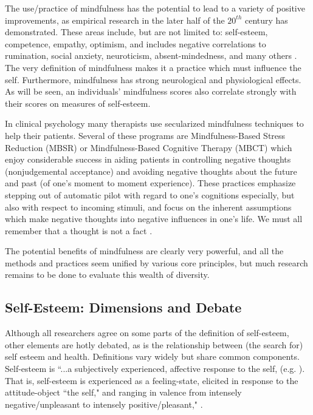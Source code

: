 \documentclass[jou]{apa}
\begin{document}
The use/practice of mindfulness has the potential to lead to a variety of positive improvements, as empirical research in the later half of the $20^{th}$ century has demonstrated. These areas include, but are not limited to: self-esteem, competence, empathy, optimism, and includes negative correlations to rumination, social anxiety, neuroticism, absent-mindedness, and many others \cite{keng2011, brown2007}.  The very definition of mindfulness makes it a practice which must influence the self.  Furthermore, mindfulness has strong neurological \cite{creswell2007} and physiological \cite{wallace1970} effects.  As will be seen, an individuals' mindfulness scores also correlate strongly with their scores on measures of self-esteem.

In clinical psychology many therapists use secularized mindfulness techniques to help their patients.  Several of these programs are Mindfulness-Based Stress Reduction (MBSR) or Mindfulness-Based Cognitive Therapy (MBCT) which enjoy considerable success in aiding patients in controlling negative thoughts (nonjudgemental acceptance) and avoiding negative thoughts about the future and past (of one's moment to moment experience).  These practices emphasize stepping out of automatic pilot with regard to one's cognitions especially, but also with respect to incoming stimuli, and focus on the inherent assumptions which make negative thoughts into negative influences in one's life.  We must all remember that a thought is not a fact \cite{fennell2004}.

The potential benefits of mindfulness are clearly very powerful, and all the methods and practices seem unified by various core principles, but much research remains to be done to evaluate this wealth of diversity.  

\subsection{Self-Esteem: Dimensions and Debate}
Although all researchers agree on some parts of the definition of self-esteem, other elements are hotly debated, as is the relationship between (the search for) self esteem and health.  Definitions vary widely but share common components.  Self-esteem is ``...a subjectively experienced, affective response to the self, (e.g. \cite{brown1993}).  That is, self-esteem is experienced as a feeling-state, elicited in response to the attitude-object ``the self," and ranging in valence from intensely negative/unpleasant to intensely positive/pleasant," \cite{bosson2006}.  
\end{document}
